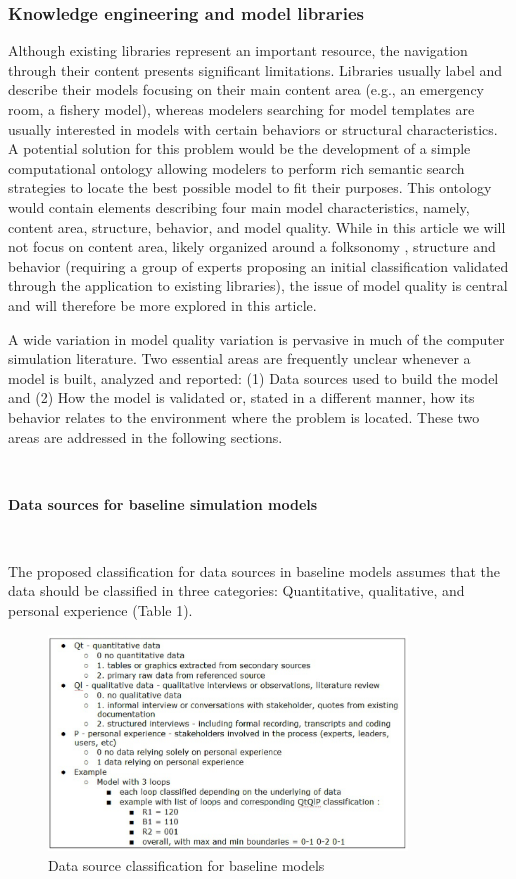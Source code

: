 \documentclass[11pt]{article}
\begin{document}
\subsubsection {Knowledge engineering and model libraries}
Although existing libraries represent an important resource, the navigation through their content presents significant limitations.  Libraries usually label and describe their models focusing on their main content area (e.g., an emergency room, a fishery model), whereas modelers searching for model templates are usually interested in models with certain behaviors or structural characteristics.  A potential solution for this problem would be the development of a simple computational ontology \cite{ALLEMANGHENDLER2008}  allowing modelers to perform rich semantic search strategies to locate the best possible model to fit their purposes.  This ontology would contain elements describing four main model characteristics, namely, content area, structure, behavior, and model quality.  While in this article we will not focus on content area, likely organized around a folksonomy \cite{WAL2008}, structure and behavior (requiring a group of experts proposing an initial classification validated through the application to existing libraries), the issue of model quality is central and will therefore be more explored in this article.

A wide variation in model quality variation is pervasive in much of the computer simulation literature.  Two essential areas are frequently unclear whenever a model is built, analyzed and reported:  (1) Data sources used to build the model and (2) How the model is validated or, stated in a different manner, how its behavior relates to the environment where the problem is located.  These two areas are addressed in the following sections.

\

\noindent \textbf{Data sources for baseline simulation models}

\

The proposed classification for data sources in baseline models assumes that the data should be classified in three categories:  Quantitative, qualitative, and personal experience (Table 1). 

\begin{figure}[htbp]
	\centering
		\includegraphics[width=0.85\textwidth]{quadro1.ps}
	\caption{Data source classification for baseline models}
	\label{fig:quadro1}
\end{figure}
\end{document}
